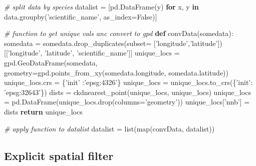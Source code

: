 \documentclass[]{article}
\newenvironment{Shaded}{}{}
\newcommand{\BuiltInTok}[1]{#1}
\newcommand{\CommentTok}[1]{\textcolor[rgb]{0.38,0.63,0.69}{\textit{#1}}}
\newcommand{\ControlFlowTok}[1]{\textcolor[rgb]{0.00,0.44,0.13}{\textbf{#1}}}
\newcommand{\KeywordTok}[1]{\textcolor[rgb]{0.00,0.44,0.13}{\textbf{#1}}}
\newcommand{\NormalTok}[1]{#1}
\newcommand{\OperatorTok}[1]{\textcolor[rgb]{0.40,0.40,0.40}{#1}}
\newcommand{\StringTok}[1]{\textcolor[rgb]{0.25,0.44,0.63}{#1}}
\newcommand{\VariableTok}[1]{\textcolor[rgb]{0.10,0.09,0.49}{#1}}
\begin{document}
\begin{Shaded}
\begin{Highlighting}[]
\CommentTok{# split data by species}
\NormalTok{datalist }\OperatorTok{=}\NormalTok{ [pd.DataFrame(y) }\ControlFlowTok{for}\NormalTok{ x, y }\KeywordTok{in}\NormalTok{ data.groupby(}\StringTok{'scientific_name'}\NormalTok{, }
\NormalTok{                                                      as_index}\OperatorTok{=}\VariableTok{False}\NormalTok{)]}


\CommentTok{# function to get unique vals anc convert to gpd}
\KeywordTok{def}\NormalTok{ convData(somedata):}
\NormalTok{    somedata }\OperatorTok{=}\NormalTok{ somedata.drop_duplicates(subset}\OperatorTok{=}
\NormalTok{    [}\StringTok{'longitude'}\NormalTok{,}\StringTok{'latitude'}\NormalTok{])[[}\StringTok{'longitude'}\NormalTok{, }\StringTok{'latitude'}\NormalTok{, }\StringTok{'scientific_name'}\NormalTok{]]}
\NormalTok{    unique_locs }\OperatorTok{=}\NormalTok{ gpd.GeoDataFrame(somedata,}
\NormalTok{                                  geometry}\OperatorTok{=}\NormalTok{gpd.points_from_xy(somedata.longitude, }
\NormalTok{                                  somedata.latitude))}
\NormalTok{    unique_locs.crs }\OperatorTok{=}\NormalTok{ \{}\StringTok{'init'}\NormalTok{ :}\StringTok{'epsg:4326'}\NormalTok{\}}
\NormalTok{    unique_locs }\OperatorTok{=}\NormalTok{ unique_locs.to_crs(\{}\StringTok{'init'}\NormalTok{: }\StringTok{'epsg:32643'}\NormalTok{\})}
\NormalTok{    dists }\OperatorTok{=}\NormalTok{ ckdnearest_point(unique_locs, unique_locs)}
\NormalTok{    unique_locs }\OperatorTok{=}\NormalTok{ pd.DataFrame(unique_locs.drop(columns}\OperatorTok{=}\StringTok{'geometry'}\NormalTok{))}
\NormalTok{    unique_locs[}\StringTok{'nnb'}\NormalTok{] }\OperatorTok{=}\NormalTok{ dists}
    \ControlFlowTok{return}\NormalTok{ unique_locs}


\CommentTok{# apply function to datalist}
\NormalTok{datalist }\OperatorTok{=} \BuiltInTok{list}\NormalTok{(}\BuiltInTok{map}\NormalTok{(convData, datalist))}
\end{Highlighting}
\end{Shaded}

\hypertarget{explicit-spatial-filter}{%
\subsection{Explicit spatial filter}\label{explicit-spatial-filter}}
\end{document}

